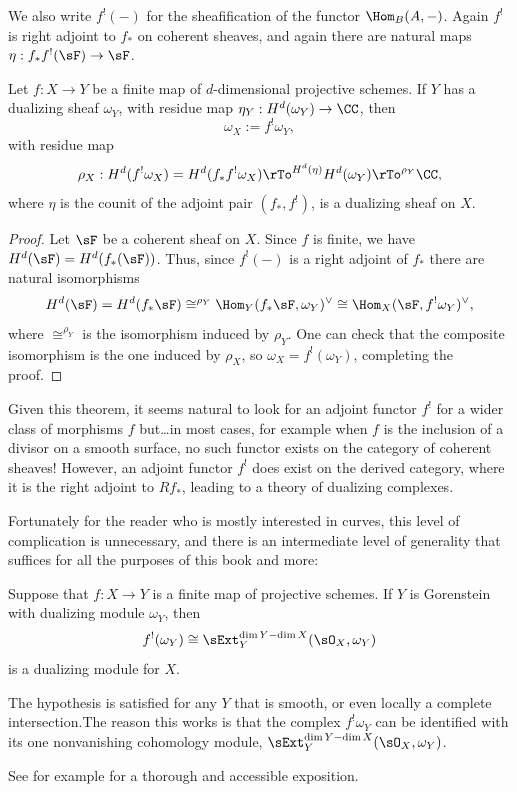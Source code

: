 We also write  $f^{!}(-)$ for the sheafification of  the functor 
$\Hom_{B}(A,-)$. Again $f^{!}$ is right adjoint to $f_{*}$ on coherent sheaves,
and again there are natural maps $\eta:f_{*}f^{!}(\sF) \to\sF$. 

\begin{theorem}\label{canonical as Hom}
Let $f: X \to Y$ be a finite map of $d$-dimensional projective schemes. If $Y$ has a dualizing sheaf $\omega_{Y}$,
with residue map $\eta_{Y}: H^{d}(\omega_{Y}) \to \CC$,
then 
 $$
\omega_{X} := f^{!}\omega_{Y},
$$
with residue map 
$$
\rho_{X}: H^{d}(f^{!}\omega_{X}) = H^{d}(f_{*}f^{!}\omega_{X}) \rTo^{H^{d}(\eta)} H^{d}(\omega_{Y}) \rTo^{\rho_{Y}} \CC,
$$ 
where $\eta$ is the counit of the adjoint pair $(f_{*},f^{!})$, is a dualizing sheaf on $X$. 
\end{theorem}

\begin{proof}
Let $\sF$ be a coherent sheaf on $X$. Since $f$ is finite, we have $H^{d}(\sF) = H^{d}(f_{*}(\sF))$. Thus,
since $f^{!}(-)$ is a right adjoint of $f_{*}$ there are natural isomorphisms
$$
H^{d}(\sF) = H^{d}(f_{*}\sF) \cong^{\rho_{Y}} \Hom_{Y}(f_{*}\sF, \omega_{Y})^{\vee} \cong 
\Hom_{X}(\sF, f^{!}\omega_{Y})^{\vee},
$$
where $\cong^{\rho_{Y}}$ is the isomorphism induced by $\rho_{Y}$. One can check that the composite
isomorphism is the one induced by $\rho_{X}$, so $\omega_X = f^{!}(\omega_{Y})$, completing the proof.\end{proof}

\begin{fact}
 Given this theorem, it seems natural to look for an adjoint functor $f^{!}$ for a wider class of morphisms
$f$ but\dots in most cases, for example when $f$ is the inclusion of a divisor on a smooth surface, no such functor exists on the category of coherent sheaves! However, an adjoint functor
$f^{!}$ does exist on the derived category, where it is the right adjoint to $Rf_{*}$, leading to a theory
of dualizing complexes. 

Fortunately for the reader who is mostly interested in curves, this level of 
complication is unnecessary, and there is an intermediate level of generality that suffices
for all the purposes of this book and more: 

\begin{theorem}\label{general adjunction}
Suppose that $f: X\to Y$ is a finite map of projective schemes. If $Y$ is
Gorenstein with dualizing module $\omega_{Y}$, then
$$
f^{!}(\omega_{Y}) \cong \sExt^{\dim Y-\dim X}_{Y}(\sO_{X}, \omega_{Y})
$$
is a dualizing module for $X$.
\end{theorem}

The hypothesis is satisfied for any $Y$ that is smooth, or even locally a complete intersection.The
reason this works is that the complex
$f^{!} \omega_{Y}$ 
can be identified with its one nonvanishing cohomology module,
 $\sExt^{\dim Y-\dim X}_{Y}(\sO_{X}, \omega_{Y})$. 

See for example \cite{AltmanKleiman} for a thorough and accessible exposition.
\end{fact}

